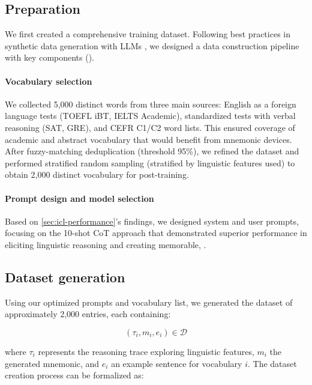 \subsection{Preparation} \label{sec:data-prep}
We first created a comprehensive training dataset. Following best practices in synthetic data generation with LLMs \citetext{\citealp{longLLMsDrivenSyntheticData2024b}, \citealp{openthoughtsteamOpenThoughts2025}}, we designed a data construction pipeline with key components ().

\paragraph*{Vocabulary selection} \label{sec:vocab-selection}
We collected 5,000 distinct words from three main sources: English as a foreign language tests (TOEFL iBT, IELTS Academic), standardized tests with verbal reasoning (SAT, GRE), and CEFR C1/C2 word lists. This ensured coverage of academic and abstract vocabulary that would benefit from mnemonic devices. After fuzzy-matching deduplication (threshold 95\%), we refined the dataset and performed stratified random sampling (stratified by linguistic features used) to obtain 2,000 distinct vocabulary for post-training.

\paragraph*{Prompt design and model selection} Based on \cref{sec:icl-performance}'s findings, we designed system and user prompts, focusing on the 10-shot CoT approach that demonstrated superior performance in eliciting linguistic reasoning and creating memorable, \lgms.

\subsection{Dataset generation} \label{sec:data-gen}

Using our optimized prompts and vocabulary list, we generated the \links dataset of approximately 2,000 entries, each containing:

\begin{equation}
(\tau_i, m_i, e_i) \in \mathcal{D}
\end{equation}

where $\tau_i$ represents the reasoning trace exploring linguistic features, $m_i$ the generated mnemonic, and $e_i$ an example sentence for vocabulary $i$. The dataset creation process can be formalized as:

